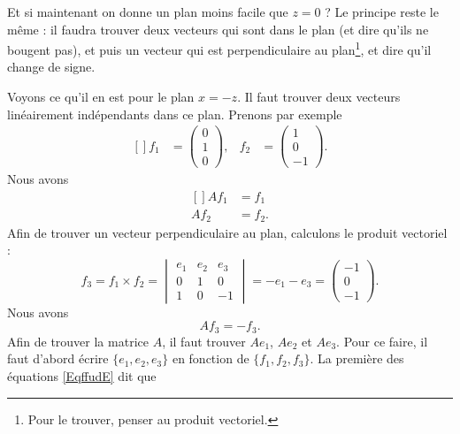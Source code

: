 Et si maintenant on donne un plan moins facile que \( z=0\) ? Le principe reste le même : il faudra trouver deux vecteurs qui sont dans le plan (et dire qu'ils ne bougent pas), et puis un vecteur qui est perpendiculaire au plan\footnote{Pour le trouver, penser au produit vectoriel.}, et dire qu'il change de signe.

Voyons ce qu'il en est pour le plan \( x=-z\). Il faut trouver deux vecteurs linéairement indépendants dans ce plan. Prenons par exemple
\begin{equation}		\label{EqffudE}
	\begin{aligned}[]
		f_1 & =\begin{pmatrix}
			       0 \\
			       1 \\
			       0
		       \end{pmatrix}, & f_2 & =\begin{pmatrix}
			                               1 \\
			                               0 \\
			                               -1
		                               \end{pmatrix}.
	\end{aligned}
\end{equation}
Nous avons
\begin{equation}
	\begin{aligned}[]
		Af_1 & =f_1  \\
		Af_2 & =f_2.
	\end{aligned}
\end{equation}
Afin de trouver un vecteur perpendiculaire au plan, calculons le produit vectoriel :
\begin{equation}
	f_3=f_1\times f_2=\begin{vmatrix}
		e_1 & e_2 & e_3 \\
		0   & 1   & 0   \\
		1   & 0   & -1
	\end{vmatrix}=-e_1-e_3=\begin{pmatrix}
		-1 \\
		0  \\
		-1
	\end{pmatrix}.
\end{equation}
Nous avons
\begin{equation}
	Af_3=-f_3.
\end{equation}
Afin de trouver la matrice \( A\), il faut trouver \( Ae_1\), \( Ae_2\) et \( Ae_3\). Pour ce faire, il faut d'abord écrire \( \{ e_1,e_2,e_3 \}\) en fonction de \( \{ f_1,f_2,f_3 \}\). La première des équations \eqref{EqffudE} dit que
